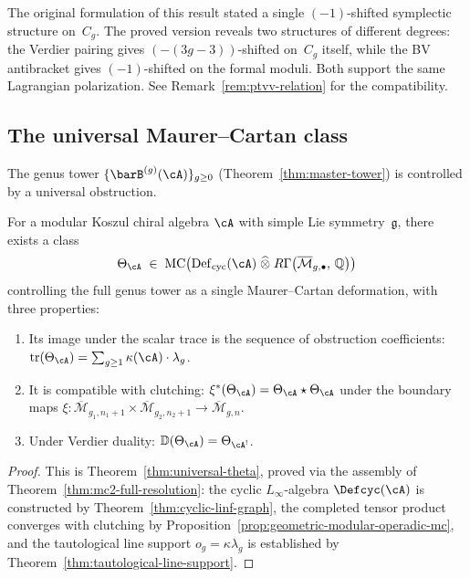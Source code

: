 \begin{remark}\label{rem:lagrangian-conj-scope}
The original formulation of this result stated a single
$(-1)$-shifted symplectic structure on~$C_g$.  The proved version
reveals two structures of different degrees: the Verdier pairing
gives $(-(3g{-}3))$-shifted on~$C_g$ itself, while the BV
antibracket gives $(-1)$-shifted on the formal moduli.  Both support
the same Lagrangian polarization.
See Remark~\ref{rem:ptvv-relation} for the compatibility.
\end{remark}

\subsection{The universal Maurer--Cartan class}

The genus tower $\{\barB^{(g)}(\cA)\}_{g \geq 0}$
(Theorem~\ref{thm:master-tower}) is controlled by a universal
obstruction.

\begin{theorem}\label{thm:universal-MC}
For a modular Koszul chiral algebra $\cA$ with simple Lie
symmetry~$\mathfrak{g}$, there exists a class
\[
\Theta_{\cA} \;\in\;
\operatorname{MC}\!\left(
  \operatorname{Def}_{\mathrm{cyc}}(\cA)
  \;\widehat{\otimes}\;
  R\Gamma\!\left(\overline{\mathcal{M}}_{g,\bullet},\, \mathbb{Q}\right)
\right)
\]
controlling the full genus tower as a single Maurer--Cartan deformation,
with three properties:
\begin{enumerate}[label=\textup{(\roman*)}]
\item Its image under the scalar trace is the sequence of obstruction
  coefficients: $\operatorname{tr}(\Theta_{\cA})
  = \sum_{g \geq 1} \kappa(\cA) \cdot \lambda_g$.
\item It is compatible with clutching:
  $\xi^*(\Theta_{\cA})
  = \Theta_{\cA} \star \Theta_{\cA}$
  under the boundary maps
  $\xi \colon \overline{\mathcal{M}}_{g_1,n_1+1} \times
  \overline{\mathcal{M}}_{g_2,n_2+1} \to
  \overline{\mathcal{M}}_{g,n}$.
\item Under Verdier duality:
  $\mathbb{D}(\Theta_{\cA}) = \Theta_{\cA^!}$.
\end{enumerate}
\end{theorem}

\begin{proof}
This is Theorem~\ref{thm:universal-theta}, proved via the
assembly of Theorem~\ref{thm:mc2-full-resolution}: the cyclic
$L_\infty$-algebra $\Defcyc(\cA)$ is constructed by
Theorem~\ref{thm:cyclic-linf-graph}, the completed tensor product
converges with clutching by
Proposition~\ref{prop:geometric-modular-operadic-mc}, and the
tautological line support $o_g = \kappa \lambda_g$ is established
by Theorem~\ref{thm:tautological-line-support}.
\end{proof}

